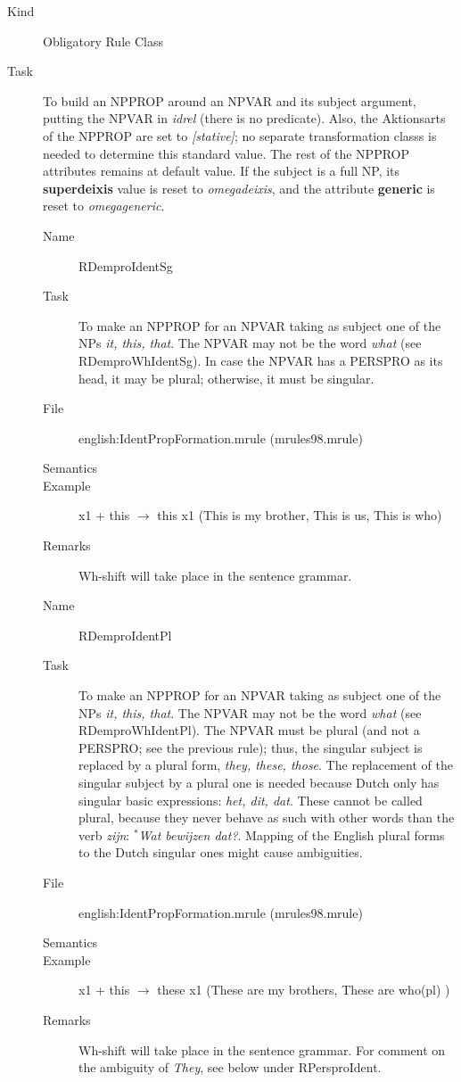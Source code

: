 \begin{description}
\item[Kind] Obligatory Rule Class
\item[Task] To build an NPPROP around an NPVAR and its subject argument, 
putting the NPVAR in {\em idrel\/} (there is no predicate). 
Also, the Aktionsarts of the NPPROP are 
set to {\em [stative]\/}; no separate transformation classs is needed to 
determine this standard value. The rest of the NPPROP attributes remains at 
default value. If the subject is a full NP, its {\bf
superdeixis} value is reset to {\em omegadeixis\/}, and the attribute {\bf 
generic} is reset to {\em omegageneric\/}.

\vspace{1 cm}
\begin{description}
\item[Name] RDemproIdentSg
\item[Task] To make an NPPROP for an NPVAR taking as subject one of the NPs {
\em it, this, that\/}. The NPVAR may not be the word {\em what\/} (see 
RDemproWhIdentSg). In case the NPVAR has a PERSPRO as its head, it may be
plural; otherwise, it must be singular.
\item[File] english:IdentPropFormation.mrule (mrules98.mrule)
\item[Semantics]
\item[Example] x1 + this $\rightarrow$ this x1 (This is my brother, This is us, 
This is who)
\item[Remarks] Wh-shift will take place in the sentence grammar.
\end{description}

\vspace{1 cm}
\begin{description}
\item[Name] RDemproIdentPl
\item[Task] To make an NPPROP for an NPVAR taking as subject one of the NPs {
\em it, this, that\/}. The NPVAR may not be the word {\em what\/} (see 
RDemproWhIdentPl). The NPVAR must be plural (and not a PERSPRO; see the 
previous rule); thus, the singular subject is replaced by a plural form, {
\em they, these, those\/}. The replacement of the singular subject by a plural 
one is needed because Dutch only has singular basic expressions: {\em het, dit, 
dat\/}. These cannot be called plural, because they never behave as such with 
other words than the verb {\em zijn\/}:  $^*${\em Wat bewijzen dat?\/}. Mapping 
of the English plural forms to the Dutch singular ones might cause 
ambiguities.
\item[File] english:IdentPropFormation.mrule (mrules98.mrule)
\item[Semantics]
\item[Example] x1 + this $\rightarrow$ these x1 (These are my brothers, These 
are who(pl) )
\item[Remarks] Wh-shift will take place in the sentence grammar. For comment on 
the ambiguity of {\em They\/}, see below under RPersproIdent.
\end{description}


\end{description}
